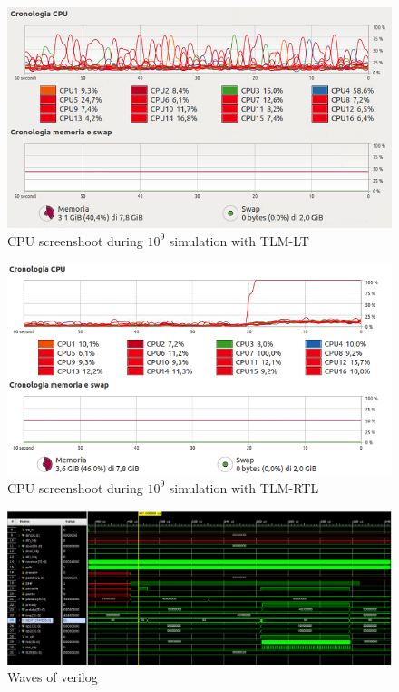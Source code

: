 \documentclass[]{IEEEtran}
\begin{document}
\begin{figure}[tb]
	\centering
	\includegraphics[scale=0.60]{figures/AT4-10-9-cpu.png}
	\caption{CPU screenshoot during $10^9$ simulation with TLM-LT}
	\label{fig:at4-cpu}
\end{figure}
\begin{figure}[tb]
\centering
\includegraphics[scale=0.60]{figures/RTL-10-9-cpu.png}
\caption{CPU screenshoot during $10^9$ simulation with TLM-RTL}
\label{fig:rtl-cpu}
\end{figure}

\begin{figure}[tb]
	\centering
	\includegraphics[scale=0.33]{figures/verilog.png}
	\caption{Waves of verilog}
	\label{fig:verilog}
\end{figure}
\end{document}
